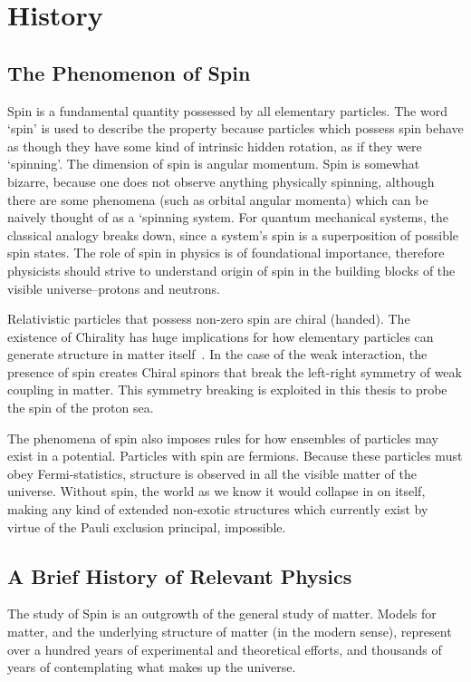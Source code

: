 \chapter{History}
\label{ch:history}
\section{The Phenomenon of Spin}

Spin is a fundamental quantity possessed by all elementary particles. The word
`spin' is used to describe the property because particles which possess spin
behave as though they have some kind of intrinsic hidden rotation, as if they
were `spinning'. The dimension of spin is angular momentum. Spin is somewhat
bizarre, because one does not observe anything physically spinning, although
there are some phenomena (such as orbital angular momenta) which can be naively
thought of as a `spinning system. For quantum mechanical systems, the classical
analogy breaks down, since a system's spin is a superposition of possible spin
states.  The role of spin in physics is of foundational importance, therefore
physicists should strive  to understand origin of spin in the building blocks of
the visible universe--protons and neutrons.

Relativistic particles that possess non-zero spin are chiral (handed).  The
existence of Chirality has huge implications for how elementary particles can
generate structure in matter itself~\cite{Brodsky1988}. In the case of the weak
interaction, the presence of spin creates Chiral spinors that break the
left-right symmetry of weak coupling in matter. This symmetry breaking is
exploited in this thesis to probe the spin of the proton sea.

The phenomena of spin also imposes rules for how ensembles of particles may
exist in a potential. Particles with spin are fermions. Because these particles
must obey Fermi-statistics, structure is observed in all the visible matter of
the universe. Without spin, the world as we know it would collapse in on itself,
making any kind of extended non-exotic structures which currently exist by
virtue of the Pauli exclusion principal, impossible.

\clearpage
\section{A Brief History of Relevant Physics}

The study of Spin is an outgrowth of the general study of matter.  Models
for matter, and the underlying structure of matter (in the modern sense),
represent over a hundred years of experimental and theoretical efforts, and
thousands of years of contemplating what makes up the universe.

